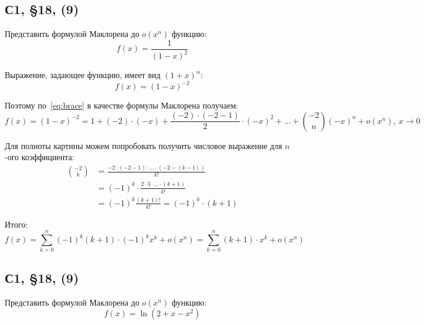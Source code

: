 \documentclass[a4paper,12pt]{article}
\begin{document}
  
  
  
  
  \subsection{С1, \S 18, (9)}
  
  Представить формулой Маклорена до $o(x^n)$ функцию:
  \[
    f(x) = \frac{1}{(1 - x)^2}
  \]
  
  \begin{solution}
    Выражение, задающее функцию, имеет вид $(1 + x)^{\alpha}$:
    \[
      f(x) = (1 - x)^{-2}
    \]
    
    Поэтому по~\eqref{eq:brace} в качестве формулы Маклорена получаем:
    \[
      f(x) = (1 - x)^{-2} = 1 + (-2) \cdot (-x) + \frac{(-2) \cdot (-2 - 1)}{2} \cdot (-x)^2 + \ldots + \binom{-2}{n} (-x)^n + o(x^n),\ x \to 0
    \]
    
    Для полноты картины можем попробовать получить числовое выражение для $n$-ого коэффициента:
    \begin{equation*}
    \begin{split}
      \binom{-2}{k} &= \frac{-2 \cdot (-2 - 1) \cdot \ldots \cdot (-2 - (k - 1))}{k!}\\
        &= (-1)^k \cdot \frac{2 \cdot 3 \cdot \ldots \cdot (k + 1)}{k!}\\
        &= (-1)^k \frac{(k + 1)!}{k!} = (-1)^k \cdot (k + 1)
    \end{split}
    \end{equation*}
    
    Итого:
    \[
      f(x) = \sum_{k = 0}^n (-1)^k (k + 1) \cdot (-1)^k x^k + o(x^n)
        = \sum_{k = 0}^n (k + 1) \cdot x^k + o(x^n)
    \]
  \end{solution}
  
  
  
  
  \subsection{С1, \S 18, (9)}
  \label{n:1-18-2(9)}
  
  Представить формулой Маклорена до $o(x^n)$ функцию:
  \[
    f(x) = \ln{(2 + x - x^2)}
  \]
  
\end{document}
